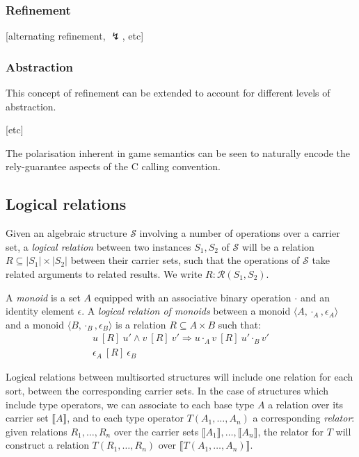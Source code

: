 \documentclass[acmsmall,timestamp,review]{acmart}
\newcommand{\ifr}[1]{\ [{#1}]\ }
\begin{document}
\subsubsection{Refinement}

[alternating refinement, $\lightning$, etc]

\subsubsection{Abstraction}

This concept of refinement can be extended to account for
different levels of abstraction.


[etc]

The polarisation inherent in game semantics
can be seen to naturally encode the rely-guarantee aspects
of the C calling convention.

\subsection{Logical relations}

Given an algebraic structure $\mathcal{S}$
involving a number of operations over a carrier set,
a \emph{logical relation}
between two instances $S_1, S_2$ of $\mathcal{S}$
will be a relation $R \subseteq |S_1| \times |S_2|$
between their carrier sets,
such that the operations of $\mathcal{S}$
take related arguments to related results.
We write $R : \mathcal{R}(S_1, S_2)$.

\begin{example}
\label{ex:monoid}
A \emph{monoid} is a set $A$ equipped with
an associative binary operation $\cdot$ and
an identity element $\epsilon$.
A \emph{logical relation of monoids} between
a monoid $\langle A, \cdot_A, \epsilon_A \rangle$ and
a monoid $\langle B, \cdot_B, \epsilon_B \rangle$
is a relation $R \subseteq A \times B$
such that:
\begin{gather*}
u \ifr{R} u' \wedge v \ifr{R} v' \Rightarrow u \cdot_A v \ifr{R} u' \cdot_B v' \\
\epsilon_A \ifr{R} \epsilon_B
\end{gather*}
\end{example}

Logical relations between multisorted structures
will include one relation for each sort,
between the corresponding carrier sets.
In the case of structures which include type operators,
we can associate to each base type $A$
a relation over its carrier set $\llbracket A \rrbracket$,
and to each type operator $T(A_1, \ldots, A_n)$
a corresponding \emph{relator}:
given relations $R_1, \ldots, R_n$ over
the carrier sets $\llbracket A_1 \rrbracket, \ldots, \llbracket A_n \rrbracket$,
the relator for $T$
will construct a relation $T(R_1, \ldots, R_n)$
over $\llbracket T(A_1, \ldots, A_n) \rrbracket$.
\end{document}
